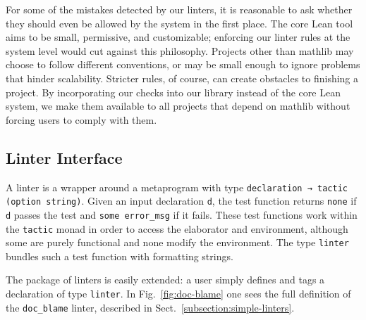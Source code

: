 \documentclass[runningheads]{llncs}
\newcommand{\mathlib}{\textsf{mathlib}\xspace}
\newcommand{\lean}[1]{\lstinline[language=lean]{#1}}
\begin{document}



For some of the mistakes detected by our linters, 
it is reasonable to ask 
whether they should even be allowed by the system in the first place.
The core Lean tool aims to be small, permissive, and customizable;
enforcing our linter rules at the system level
would cut against this philosophy.
Projects other than \mathlib may choose to follow different conventions,
or may be small enough
to ignore problems that hinder scalability.
Stricter rules, of course, can create obstacles to finishing a project.
By incorporating our checks into our library instead of the core Lean system,
we make them available to all projects that depend on \mathlib 
without forcing users to comply with them.

\subsection{Linter Interface}
A linter is a wrapper around a metaprogram with type
\lean{declaration → tactic} \lean{(option string)}. %
Given an input declaration \lean{d},
the test function returns \lean{none} if \lean{d} passes the test
and \lean{some error_msg} if it fails.
These test functions work within the \lean{tactic} monad
in order to access the elaborator and environment,
although some are purely functional
and none modify the environment.
The type \lean{linter} bundles such a test function with formatting strings.

The package of linters is easily extended:
a user simply defines and tags a declaration of type \lean{linter}.
In Fig.~\ref{fig:doc-blame}
one sees the full definition of the \lean{doc_blame} linter,
described in Sect.~\ref{subsection:simple-linters}.
\end{document}

